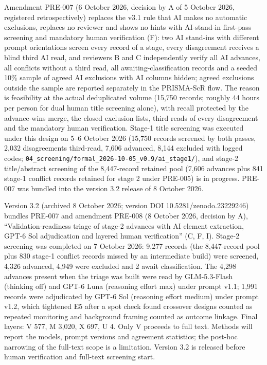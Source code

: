 \documentclass[
  11pt,
  a4paper,
]{article}
\begin{document}
Amendment PRE-007 (6 October 2026, decision by A of 5 October 2026,
registered retrospectively) replaces the v3.1 rule that AI makes no
automatic exclusions, replaces no reviewer and shows no hints with
AI-stand-in first-pass screening and mandatory human verification (F):
two AI stand-ins with different prompt orientations screen every record
of a stage, every disagreement receives a blind third AI read, and
reviewers B and C independently verify all AI advances, all conflicts
without a third read, all awaiting-classification records and a seeded
10\% sample of agreed AI exclusions with AI columns hidden; agreed
exclusions outside the sample are reported separately in the PRISMA-ScR
flow. The reason is feasibility at the actual deduplicated volume
(15,750 records; roughly 44 hours per person for dual human title
screening alone), with recall protected by the advance-wins merge, the
closed exclusion lists, third reads of every disagreement and the
mandatory human verification. Stage-1 title screening was executed under
this design on 5--6 October 2026 (15,750 records screened by both
passes, 2,032 disagreements third-read, 7,606 advanced, 8,144 excluded
with logged codes;
\texttt{04\_screening/formal\_2026-10-05\_v0.9/ai\_stage1/}), and
stage-2 title/abstract screening of the 8,447-record retained pool
(7,606 advances plus 841 stage-1 conflict records retained for stage 2
under PRE-005) is in progress. PRE-007 was bundled into the version 3.2
release of 8 October 2026.

Version 3.2 (archived 8 October 2026; version DOI
10.5281/zenodo.23229246) bundles PRE-007 and amendment PRE-008 (8
October 2026, decision by A), ``Validation-readiness triage of stage-2
advances with AI element extraction, GPT-6 Sol adjudication and layered
human verification'' (C, F, I). Stage-2 screening was completed on 7
October 2026: 9,277 records (the 8,447-record pool plus 830 stage-1
conflict records missed by an intermediate build) were screened, 4,326
advanced, 4,949 were excluded and 2 await classification. The 4,298
advances present when the triage was built were read by GLM-5.3-Flash
(thinking off) and GPT-6 Luna (reasoning effort max) under prompt v1.1;
1,991 records were adjudicated by GPT-6 Sol (reasoning effort medium)
under prompt v1.2, which tightened E5 after a spot check found crossover
designs counted as repeated monitoring and background framing counted as
outcome linkage. Final layers: V 577, M 3,020, X 697, U 4. Only V
proceeds to full text. Methods will report the models, prompt versions
and agreement statistics; the post-hoc narrowing of the full-text scope
is a limitation. Version 3.2 is released before human verification and
full-text screening start.
\end{document}
